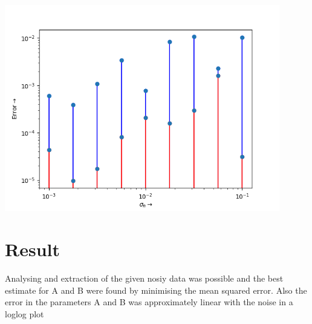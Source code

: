 \documentclass[10pt,a4paper]{article}
\begin{document}
\includegraphics[width = 0.9\textwidth]{figure_5.png}

\section{Result}

Analysing and extraction of the given nosiy data was possible and the best estimate for A and B were found by minimising the mean squared error. Also the error in the parameters A and B was approximately linear with the noise in a loglog plot
\end{document}
